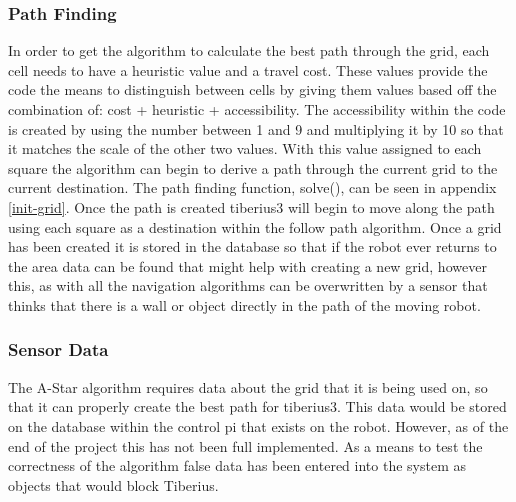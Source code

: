 \subsubsection{Path Finding}
In order to get the algorithm to calculate the best path through the grid, each cell needs to have a heuristic value and a travel cost. These values provide the code the means to distinguish between cells by giving them values based off the combination of: cost + heuristic + accessibility. The accessibility within the code is created by using the number between 1 and 9 and multiplying it by 10 so that it matches the scale of the other two values. With this value assigned to each square the algorithm can begin to derive a path through the current grid to the current destination. The path finding function, solve(), can be seen in appendix \ref{init-grid}. Once the path is created \gls{tiberius3} will begin to move along the path using each square as a destination within the follow path algorithm. Once a grid has been created it is stored in the database so that if the robot ever returns to the area data can be found that might help with creating a new grid, however this, as with all the navigation algorithms can be overwritten by a sensor that thinks that there is a wall or object directly in the path of the moving robot.
\subsubsection{Sensor Data}
The A-Star algorithm requires data about the grid that it is being used on, so that it can properly create the best path for \gls{tiberius3}. This data would be stored on the database within the control pi that exists on the robot. However, as of the end of the project this has not been full implemented. As a means to test the correctness of the algorithm false data has been entered into the system as objects that would block Tiberius.






















